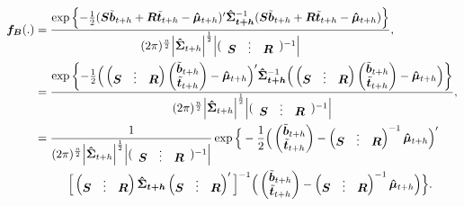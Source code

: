 \documentclass[a4paper, 11pt]{article}
\begin{document}
	\begin{align*}
	\bm{f_B}(.)
	& =
	\frac{\exp\left\{-\frac{1}{2}(\bm{S}\tilde{\bm{b}}_{t+h}+\bm{R}\tilde{\bm{t}}_{t+h}-\bm{\hat{\mu}}_{t+h})' \bm{\hat{\Sigma}_{t+h}}^{-1}(\bm{S}\tilde{\bm{b}}_{t+h}+\bm{R}\tilde{\bm{t}}_{t+h}-\bm{\hat{\mu}}_{t+h})\right\}}{(2\pi)^{\frac{n}{2}}\Big|\bm{\hat{\Sigma}}_{t+h}\Big|^{\frac{1}{2}}\Big|(\begin{array}{ccc}\bm{S} & \vdots& \bm{R}\end{array})^{-1} \Big|},\\
	& =
	\frac{\exp\left\{-\frac{1}{2}\Big(\begin{pmatrix}\bm{S} & \vdots& \bm{R}\end{pmatrix}\begin{pmatrix}\tilde{\bm{b}}_{t+h}\\ \tilde{\bm{t}}_{t+h}\end{pmatrix}-\bm{\hat{\mu}}_{t+h}\Big)' \bm{\hat{\Sigma}_{t+h}}^{-1}\Big(\begin{pmatrix}\bm{S} & \vdots& \bm{R}\end{pmatrix}\begin{pmatrix}\tilde{\bm{b}}_{t+h}\\ \tilde{\bm{t}}_{t+h}\end{pmatrix}-\bm{\hat{\mu}}_{t+h}\Big)\right\}}{(2\pi)^{\frac{n}{2}}\Big|\bm{\hat{\Sigma}}_{t+h}\Big|^{\frac{1}{2}}\Big|(\begin{array}{ccc}\bm{S} & \vdots& \bm{R}\end{array})^{-1} \Big|},\\
	& =
	\frac{1}{(2\pi)^{\frac{n}{2}}\Big|\bm{\hat{\Sigma}}_{t+h}\Big|^{\frac{1}{2}}\Big|(\begin{array}{ccc}\bm{S} & \vdots& \bm{R}\end{array})^{-1} \Big|}
	\exp \Big\{-\frac{1}{2}\Big(\begin{pmatrix}\tilde{\bm{b}}_{t+h}\\ \tilde{\bm{t}}_{t+h}\end{pmatrix}-\begin{pmatrix}\bm{S} & \vdots& \bm{R}\end{pmatrix}^{-1}\bm{\hat{\mu}}_{t+h}\Big)'\\
	& \hspace*{1cm} \Big[\begin{pmatrix}\bm{S} & \vdots& \bm{R}\end{pmatrix}\bm{\hat{\Sigma}_{t+h}}\begin{pmatrix}\bm{S} & \vdots& \bm{R}\end{pmatrix}'\Big]^{-1}
	\Big(\begin{pmatrix}\tilde{\bm{b}}_{t+h}\\ \tilde{\bm{t}}_{t+h}\end{pmatrix}-\begin{pmatrix}\bm{S} & \vdots& \bm{R}\end{pmatrix}^{-1}\bm{\hat{\mu}}_{t+h}\Big) \Big\}.
	\end{align*}
\end{document}
